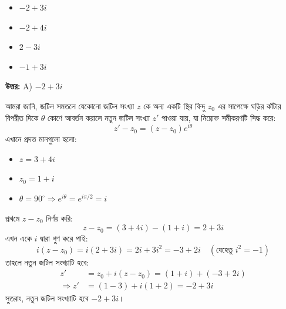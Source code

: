\documentclass[12pt, a4paper]{article}
\begin{document}
\begin{itemize}[label={}, leftmargin=1cm, itemsep=0.5em]
    \item[\textbf{A)}] $-2 + 3i$
    \item[\textbf{B)}] $-2 + 4i$
    \item[\textbf{C)}] $2 - 3i$
    \item[\textbf{D)}] $-1 + 3i$
\end{itemize}

\vspace{0.5em}
\begin{tcolorbox}[answerbox]
    \textbf{\color{success} উত্তর:} A) $-2 + 3i$
\end{tcolorbox}
\vspace{1em}

\begin{tcolorbox}[solutionbox={সমাধান (Solution)}]
    \noindent
    আমরা জানি, জটিল সমতলে যেকোনো জটিল সংখ্যা $z$ কে অন্য একটি স্থির বিন্দু $z_0$ এর সাপেক্ষে ঘড়ির কাঁটার বিপরীত দিকে $\theta$ কোণে আবর্তন করালে নতুন জটিল সংখ্যা $z'$ পাওয়া যায়, যা নিম্নোক্ত সমীকরণটি সিদ্ধ করে:
    \[ z' - z_0 = (z - z_0) e^{i\theta} \]
    এখানে প্রদত্ত মানগুলো হলো:
    \begin{itemize}
        \item $z = 3+4i$
        \item $z_0 = 1+i$
        \item $\theta = 90^\circ \Rightarrow e^{i\theta} = e^{i\pi/2} = i$
    \end{itemize}
    প্রথমে $z - z_0$ নির্ণয় করি:
    \[ z - z_0 = (3+4i) - (1+i) = 2 + 3i \]
    এখন একে $i$ দ্বারা গুণ করে পাই:
    \[ i(z - z_0) = i(2 + 3i) = 2i + 3i^2 = -3 + 2i \quad (\text{যেহেতু } i^2 = -1) \]
    তাহলে নতুন জটিল সংখ্যাটি হবে:
    \begin{align*}
        z' &= z_0 + i(z - z_0) = (1+i) + (-3+2i) \\
        \Rightarrow z' &= (1 - 3) + i(1 + 2) = -2 + 3i
    \end{align*}
    সুতরাং, নতুন জটিল সংখ্যাটি হবে $-2 + 3i$।
\end{tcolorbox}

\vspace{1em}
\end{document}
